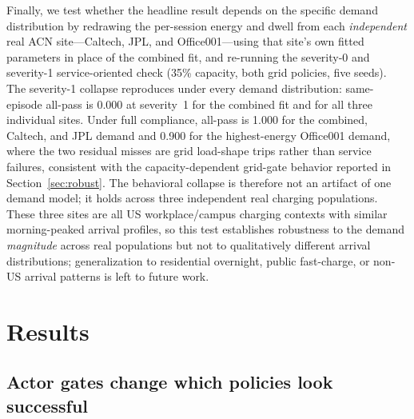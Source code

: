 \documentclass[12pt]{article}
\begin{document}
Finally, we test whether the headline result depends on the specific demand distribution by redrawing the per-session energy and dwell from each \emph{independent} real ACN site---Caltech, JPL, and Office001---using that site's own fitted parameters in place of the combined fit, and re-running the severity-0 and severity-1 service-oriented check (35\% capacity, both grid policies, five seeds). The severity-1 collapse reproduces under every demand distribution: same-episode all-pass is 0.000 at severity~1 for the combined fit and for all three individual sites. Under full compliance, all-pass is 1.000 for the combined, Caltech, and JPL demand and 0.900 for the highest-energy Office001 demand, where the two residual misses are grid load-shape trips rather than service failures, consistent with the capacity-dependent grid-gate behavior reported in Section~\ref{sec:robust}. The behavioral collapse is therefore not an artifact of one demand model; it holds across three independent real charging populations. These three sites are all US workplace/campus charging contexts with similar morning-peaked arrival profiles, so this test establishes robustness to the demand \emph{magnitude} across real populations but not to qualitatively different arrival distributions; generalization to residential overnight, public fast-charge, or non-US arrival patterns is left to future work.

\section{Results}\label{sec:results}

\subsection{Actor gates change which policies look successful}
\end{document}
